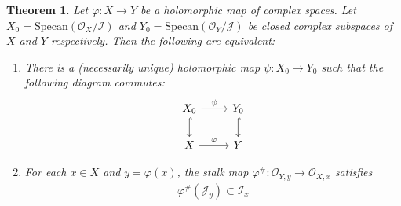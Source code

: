 \documentclass[12pt,b5paper,notitlepage]{report}
\theoremstyle{definition}
\theoremstyle{plain}
\newtheorem{thm}[df]{Theorem}
\newcommand{\mc}{\mathcal}
\newcommand{\scr}{\mathscr}
\newcommand{\Specan}{\mathrm{Specan}}
\numberwithin{equation}{section}
\begin{document}
\begin{thm}\label{lb13}
Let $\varphi:X\rightarrow Y$ be a holomorphic map of complex spaces. Let $X_0=\Specan(\scr O_X/\mc I)$ and $Y_0=\Specan(\scr O_Y/\mc J)$ be closed complex subspaces of $X$ and $Y$ respectively. Then the following are equivalent:
\begin{enumerate}[label=(\alph*)]
\item There is a (necessarily unique) holomorphic map $\psi:X_0\rightarrow Y_0$ such that the following diagram commutes:
\begin{equation}\label{eq7}
\begin{tikzcd}
X_0 \arrow[r, "\psi"] \arrow[d, hook] & Y_0 \arrow[d, hook] \\
X \arrow[r,"\varphi"]                                            & Y               
\end{tikzcd}
\end{equation}
\item For each $x\in X$ and $y=\varphi(x)$, the stalk map $\varphi^\#:\scr O_{Y,y}\rightarrow\scr O_{X,x}$ satisfies
\begin{align*}
\varphi^\#(\mc J_y)\subset\mc I_x
\end{align*}
\end{enumerate}
\end{thm}
\end{document}
